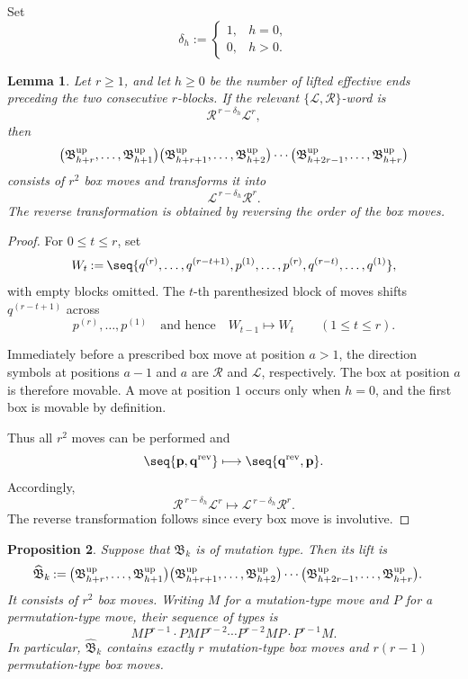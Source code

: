 \documentclass[12pt, leqno]{amsart}
\numberwithin{equation}{section}
\theoremstyle{plain}
\newtheorem{lemma}{Lemma}[section]
\newtheorem{proposition}[lemma]{Proposition}
\theoremstyle{definition}
\renewcommand{\le}{\leqslant}
\renewcommand{\ge}{\geqslant}
\newcommand{\seteq}{\mathbin{:=}}
\newcommand{\rev}{{\rm rev}}
\newcommand{\up}{{\rm up}}
\newcommand{\frakB}{\mathfrak{B}}
\newcommand{\bfp}{\mathbf{p}}
\newcommand{\bfq}{\mathbf{q}}
\newcommand{\calL}{\mathcal{L}}
\newcommand{\calR}{\mathcal{R}}
\newcommand{\hfrakB}{\widehat{\frakB}}
\newcommand{\qtqh}[1][{and hence}]{\quad\text{{#1}}\quad}
\begin{document}
Set
\[
\delta_h\seteq
\begin{cases}
1,& h=0,\\
0,& h>0.
\end{cases}
\]

\begin{lemma}\label{lem: lifted mutation box moves}
Let $r\ge1$, and let $h\ge0$ be the number of lifted effective ends
preceding the two consecutive $r$-blocks. If the relevant
$\{\calL,\calR\}$-word is
\[
\calR^{\,r-\delta_h}\calL^r,
\]
then
\[
\bigl(\frakB^\up_{h+r},\ldots,\frakB^\up_{h+1}\bigr)
\bigl(\frakB^\up_{h+r+1},\ldots,\frakB^\up_{h+2} \bigr)
\cdots \bigl(\frakB^\up_{h+2r-1},\ldots,\frakB^\up_{h+r}\bigr)
\]
consists of $r^2$ {} box moves and transforms it into
\[
\calL^{\,r-\delta_h}\calR^r.
\]
The reverse transformation is obtained by reversing the order of the box moves.
\end{lemma}

\begin{proof}
For $0\le t\le r$, set
\[
W_t\seteq \seq{ q^{(r)},\ldots,q^{(r-t+1)}, p^{(1)},\ldots,p^{(r)}, q^{(r-t)},\ldots,q^{(1)} },
\]
with empty blocks omitted. The $t$-th parenthesized block of moves shifts $q^{(r-t+1)}$ across
\[
p^{(r)},\ldots,p^{(1)} \qtqh W_{t-1}\longmapsto W_t \qquad (1\le t\le r).
\]

 Immediately before a prescribed box move at position $a>1$, the direction symbols at positions $a-1$ and $a$ are $\calR$ and $\calL$, respectively.
The box at position $a$ is therefore movable.
A move at position $1$ occurs only when $h=0$, and the first box is movable by definition.

Thus all $r^2$  moves can be performed and
\[
\seq{\bfp,\bfq^{\rev}} \longmapsto \seq{\bfq^{\rev},\bfp}.
\]
Accordingly,
\[
\calR^{\,r-\delta_h}\calL^r \longmapsto \calL^{\,r-\delta_h}\calR^r.
\]
The reverse transformation follows since every box move is
involutive.
\end{proof}

\begin{proposition}\label{prop: lift of mutation box move}
Suppose that $\frakB_k$ is of mutation type. Then its lift is
\begin{align*}
\hfrakB_k\seteq{}& \bigl(\frakB^\up_{h+r},\ldots,\frakB^\up_{h+1} \bigr) \bigl(\frakB^\up_{h+r+1},\ldots,\frakB^\up_{h+2}\bigr)
\cdots
\bigl(\frakB^\up_{h+2r-1},\ldots,\frakB^\up_{h+r} \bigr).
\end{align*}
It consists of $r^2$ box moves. Writing $M$ for a mutation-type move
and $P$ for a permutation-type move, their sequence of types is \[
MP^{r-1}\cdot PMP^{r-2}\cdots P^{r-2}MP\cdot P^{r-1}M.
\]
In particular, $\hfrakB_k$ contains exactly $r$ mutation-type box moves and $r(r-1)$ permutation-type box moves.
\end{proposition}
\end{document}
